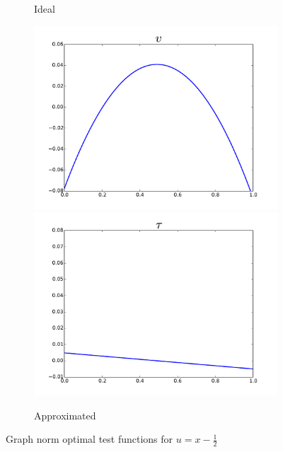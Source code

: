 \documentclass[Dissertation.tex]{subfiles}
\begin{document}
\begin{figure}[ht]
\begin{subfigure}[t]{0.45\textwidth}
\caption{Ideal}
\label{fig:idealGraph}
\end{subfigure}
\begin{subfigure}[t]{0.45\textwidth}
\centering
\includegraphics[width=\textwidth]{OptimalTestFunctions/uLinear_1e-2/steady/graph_steady_v_approx3}\\
\includegraphics[width=\textwidth]{OptimalTestFunctions/uLinear_1e-2/steady/graph_steady_tau_approx3}\\
\caption{Approximated}
\label{fig:approxGraph}
\end{subfigure}
\caption{Graph norm optimal test functions for $u=x-\frac{1}{2}$}
\label{fig:optimalGraph}
\end{figure}
\end{document}
